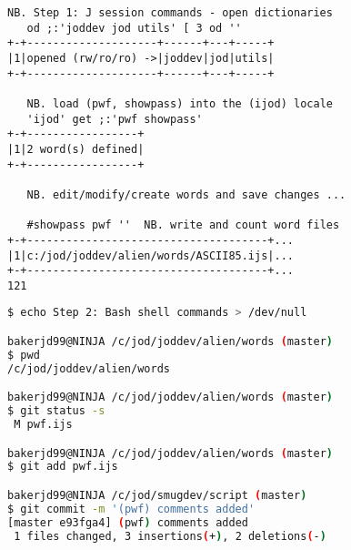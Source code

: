 \begin{enumerate}
\begin{lstlisting}[frame=single,framerule=0pt,basicstyle=\ttfamily\footnotesize]
   NB. Step 1: J session commands - open dictionaries
   od ;:'joddev jod utils' [ 3 od ''
+-+--------------------+------+---+-----+
|1|opened (rw/ro/ro) ->|joddev|jod|utils|
+-+--------------------+------+---+-----+

   NB. load (pwf, showpass) into the (ijod) locale
   'ijod' get ;:'pwf showpass'
+-+-----------------+
|1|2 word(s) defined|
+-+-----------------+

   NB. edit/modify/create words and save changes ...

   #showpass pwf ''  NB. write and count word files
+-+-------------------------------------+...
|1|c:/jod/joddev/alien/words/ASCII85.ijs|...
+-+-------------------------------------+...
121
\end{lstlisting}

\begin{lstlisting}[language=bash,frame=single,framerule=0pt
,basicstyle=\ttfamily\footnotesize,backgroundcolor=\color{CodeBackGround}]
$ echo Step 2: Bash shell commands > /dev/null

bakerjd99@NINJA /c/jod/joddev/alien/words (master)
$ pwd
/c/jod/joddev/alien/words

bakerjd99@NINJA /c/jod/joddev/alien/words (master)
$ git status -s
 M pwf.ijs

bakerjd99@NINJA /c/jod/joddev/alien/words (master)
$ git add pwf.ijs

bakerjd99@NINJA /c/jod/smugdev/script (master)
$ git commit -m '(pwf) comments added'
[master e93fga4] (pwf) comments added
 1 files changed, 3 insertions(+), 2 deletions(-)
\end{lstlisting}







\end{enumerate}  